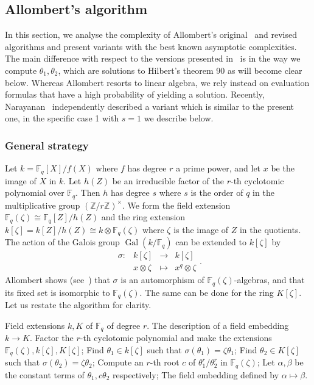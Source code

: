 \documentclass[12pt]{article}
\theoremstyle{plain}
\theoremstyle{definition}
\DeclareMathOperator{\gal}{Gal} %
\def\Z{\ensuremath{\mathbb{Z}}}
\def\F{\ensuremath{\mathbb{F}}}
\newcounter{algorithm}
\begin{document}
\subsection{Allombert's algorithm}
\label{sec:fast-kummer}

In this section, we analyse the complexity of Allombert's original~\cite{Allombert02} and revised~\cite{Allombert02-rev} algorithms
and present variants with the best known asymptotic complexities.
The main difference with respect to the 
versions presented in~\cite{Allombert02,Allombert02-rev} is in the way
we compute $\theta_1, \theta_2$, which are solutions to Hilbert's theorem 90
as will become clear below.
Whereas Allombert resorts to linear algebra, we rely instead on evaluation
formulas that have a high probability of yielding a solution.
Recently, Narayanan~\cite[Sec.~3]{narayanan2016fast} independently described 
a variant which is similar to the present one,
in the specific case 1 with $s=1$ we describe below.

\subsubsection{General strategy}
Let $k=\F_q[X]/f(X)$ where $f$ has degree $r$ a prime power, and let $x$ be the image of $X$ in $k$.
Let $h(Z)$ be an 
irreducible factor of the $r$-th cyclotomic polynomial over $\F_q$. Then $h$ has degree $s$ where 
$s$ is the order of $q$ in the multiplicative group $(\Z/r\Z)^\times$. We form the field extension
$\F_q(\zeta) \cong \F_q[Z] / h(Z)$ and the ring extension $k[\zeta] = k[Z] / h(Z) \cong k \otimes
\F_q(\zeta)$ where $\zeta$ is the image of $Z$ in the quotients. The action of the Galois group
$\gal(k / \F_q)$ can be extended to $k[\zeta]$ by
\[
\left.
\begin{array}{llll}
\sigma: & k[\zeta] & \rightarrow & k[\zeta] \\
& x \otimes \zeta & \mapsto & x^q \otimes \zeta
\end{array}
\right.
.
\]
Allombert shows (see~\cite[Prop.~3.2]{Allombert02}) that $\sigma$ is
an automorphism of $\F_q(\zeta)$-algebras, and that its fixed set is
isomorphic to $\F_q(\zeta)$.
The same can be done for the ring $K[\zeta]$.
Let us restate the algorithm for clarity.

\begin{algorithm}
	\begin{algorithmic}[1]
		\REQUIRE Field extensions $k, K$ of $\F_q$ of degree $r$.
		\ENSURE The description of a field embedding $k\to K$.
		\STATE Factor the $r$-th cyclotomic polynomial and make the extensions $\F_q(\zeta), 
		k[\zeta], K[\zeta]$;
		\STATE Find $\theta_1 \in k[\zeta]$ such that $\sigma(\theta_1) = \zeta\theta_1$;
		\STATE Find $\theta_2 \in K[\zeta]$ such that $\sigma(\theta_2) = \zeta\theta_2$;
		\STATE Compute an $r$-th root $c$ of $\theta_1^r / \theta_2^r$ in $\F_q(\zeta)$;
		\STATE Let $\alpha, \beta$ be the constant terms of $\theta_1, c\theta_2$ respectively;
		\RETURN The field embedding defined by $\alpha\mapsto\beta$.
	\end{algorithmic}
        \label{alog:allombert}
\end{algorithm}
\end{document}
